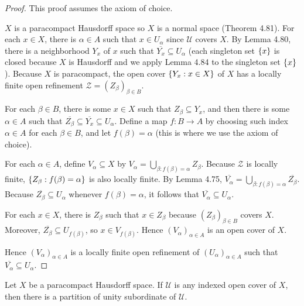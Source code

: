 \begin{proof}
	This proof assumes the axiom of choice.

	$X$ is a paracompact Hausdorff space so $X$ is a normal space (Theorem 4.81). For each $x\in X$, there is $\alpha\in A$ such that $x\in U_{\alpha}$ since $\mathscr{U}$ covers $X$. By Lemma 4.80, there is a neighborhood $Y_{x}$ of $x$ such that $\overline{Y_{x}} \subseteq U_{\alpha}$ (each singleton set $\left\{{x}\right\}$ is closed because $X$ is Hausdorff and we apply Lemma 4.84 to the singleton set $\left\{{x}\right\}$). Because $X$ is paracompact, the open cover $\left\{{ Y_{x} : x\in X }\right\}$ of $X$ has a locally finite open refinement $\mathcal{Z} = {(Z_{\beta})}_{\beta\in B}$.

	For each $\beta\in B$, there is some $x\in X$ such that $Z_{\beta} \subseteq Y_{x}$, and then there is some $\alpha\in A$ such that $\overline{Z_{\beta}} \subseteq \overline{Y_{x}} \subseteq U_{\alpha}$. Define a map $f: B\to A$ by choosing such index $\alpha\in A$ for each $\beta\in B$, and let $f(\beta) = \alpha$ (this is where we use the axiom of choice).

	For each $\alpha\in A$, define $V_{\alpha} \subseteq X$ by $V_{\alpha} = \bigcup_{\beta : f(\beta) = \alpha} Z_{\beta}$. Because $\mathcal{Z}$ is locally finite, $\left\{{ Z_{\beta} : f(\beta) = \alpha }\right\}$ is also locally finite. By Lemma 4.75, $\overline{V_{\alpha}} = \bigcup_{\beta: f(\beta) = \alpha}\overline{Z_{\beta}}$. Because $\overline{Z_{\beta}} \subseteq U_{\alpha}$ whenever $f(\beta) = \alpha$, it follows that $\overline{V_{\alpha}} \subseteq U_{\alpha}$.

	For each $x\in X$, there is $Z_{\beta}$ such that $x\in Z_{\beta}$ because ${(Z_{\beta})}_{\beta\in B}$ covers $X$. Moreover, $\overline{Z_{\beta}} \subseteq U_{f(\beta)}$, so $x \in V_{f(\beta)}$. Hence ${(V_{\alpha})}_{\alpha\in A}$ is an open cover of $X$.

	Hence ${(V_{\alpha})}_{\alpha\in A}$ is a locally finite open refinement of ${(U_{\alpha})}_{\alpha\in A}$ such that $\overline{V_{\alpha}} \subseteq U_{\alpha}$.
\end{proof}

\begin{theorem}{4.85}
	Let $X$ be a paracompact Hausdorff space. If $\mathscr{U}$ is any indexed open cover of $X$, then there is a partition of unity subordinate of $\mathscr{U}$.
\end{theorem}


